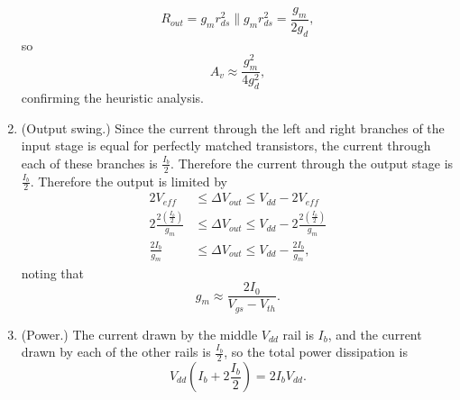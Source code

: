 \documentclass{article}
\begin{document}
\begin{enumerate}
{\begin{enumerate}
{         $$
         R_{out} = g_m r_{ds}^2 \| g_m r_{ds}^2 = \frac{g_m}{2 g_d},
         $$
         so
         $$
         A_v \approx \frac{g_m^2}{4g_d^2},
         $$
         confirming the heuristic analysis.
       }
\end{enumerate}
}
\item{(Output swing.)
Since the current through the left and right branches of the input stage
is equal for perfectly matched transistors, the current through each of
these branches is $\frac{I_b}{2}$. Therefore the current through the output
stage is $\frac{I_b}{2}.$
Therefore the output is limited by
\begin{align*}
2V_{eff} &\leq \Delta V_{out} \leq V_{dd} - 2V_{eff} \\
2\frac{2 \left(\frac{I_b}{2}\right)}{g_m} 
  & \leq \Delta V_{out} 
    \leq V_{dd} - 2\frac{2 \left(\frac{I_b}{2}\right)}{g_m} \\
\frac{2 I_b}{g_m} &\leq \Delta V_{out} \leq V_{dd} - \frac{2 I_b}{g_m},
\end{align*}
noting that
$$
g_m \approx \frac{2 I_0}{V_{gs} - V_{th}}.
$$
}
\item{(Power.)
The current drawn by the middle $V_{dd}$ rail is $I_b$, and the current
drawn by each of the other rails is $\frac{I_b}{2}$, so the total power
dissipation is
$$
V_{dd}\left(I_b + 2\frac{I_b}{2}\right) = 2 I_b V_{dd}.
$$
}
\end{enumerate}

\pagebreak
\end{document}
